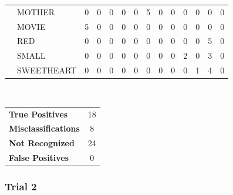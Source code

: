 \documentclass[12pt]{article}
\begin{document}
\begin{table}[h]
\begin{tabular}{ll|c|c|c|c|c|c|c|c|c|c|c|c|}
\multicolumn{1}{|l}{}          & \multicolumn{1}{|l|}{MOTHER}     & 0   & 0   & 0         & 0     & 0    & 5      & 0     & 0   & 0     & 0          & 0              & 0              \\ \cline{2-14} 
\multicolumn{1}{|l}{}          & \multicolumn{1}{|l|}{MOVIE}      & 5   & 0   & 0         & 0     & 0    & 0      & 0     & 0   & 0     & 0          & 0              & 0              \\ \cline{2-14} 
\multicolumn{1}{|l}{}          & \multicolumn{1}{|l|}{RED}        & 0   & 0   & 0         & 0     & 0    & 0      & 0     & 0   & 0     & 0          & 5              & 0              \\ \cline{2-14} 
\multicolumn{1}{|l}{}          & \multicolumn{1}{|l|}{SMALL}      & 0   & 0   & 0         & 0     & 0    & 0      & 0     & 0   & 2     & 0          & 3              & 0              \\ \cline{2-14} 
\multicolumn{1}{|l}{}          & \multicolumn{1}{|l|}{SWEETHEART} & 0   & 0   & 0         & 0     & 0    & 0      & 0     & 0   & 0     & 1          & 4              & 0              \\ \hline
\end{tabular}
\\
\begin{tabular}{l c}

\textbf{True Positives} & 18 \\
\textbf{Misclassifications} & 8 \\
\textbf{Not Recognized} & 24 \\
\textbf{False Positives} & 0 \\

\end{tabular}
\end{table}

\newpage
\subsubsection*{Trial 2}
\end{document}
